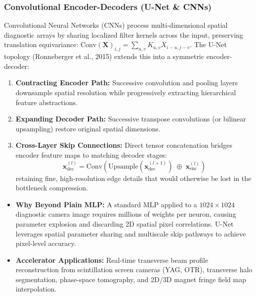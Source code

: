 \documentclass[11pt,a4paper]{article}
\begin{document}
\subsubsection{Convolutional Encoder-Decoders (U-Net \& CNNs)}
Convolutional Neural Networks (CNNs) process multi-dimensional spatial diagnostic arrays by sharing localized filter kernels across the input, preserving translation equivariance: $\text{Conv}(\mathbf{X})_{i,j} = \sum_{u,v} K_{u,v} X_{i-u, j-v}$. The U-Net topology (Ronneberger et al., 2015) extends this into a symmetric encoder-decoder:
\begin{enumerate}
    \item \textbf{Contracting Encoder Path:} Successive convolution and pooling layers downsample spatial resolution while progressively extracting hierarchical feature abstractions.
    \item \textbf{Expanding Decoder Path:} Successive transpose convolutions (or bilinear upsampling) restore original spatial dimensions.
    \item \textbf{Cross-Layer Skip Connections:} Direct tensor concatenation bridges encoder feature maps to matching decoder stages:
    \begin{equation}
        \mathbf{x}_{\text{dec}}^{(l)} = \text{Conv}\left( \text{Upsample}\left(\mathbf{x}_{\text{dec}}^{(l+1)}\right) \;\oplus\; \mathbf{x}_{\text{enc}}^{(l)} \right)
    \end{equation}
    retaining fine, high-resolution edge details that would otherwise be lost in the bottleneck compression.
\end{enumerate}
\begin{itemize}
    \item \textbf{Why Beyond Plain MLP:} A standard MLP applied to a $1024 \times 1024$ diagnostic camera image requires millions of weights per neuron, causing parameter explosion and discarding 2D spatial pixel correlations. U-Net leverages spatial parameter sharing and multiscale skip pathways to achieve pixel-level accuracy.
    \item \textbf{Accelerator Applications:} Real-time transverse beam profile reconstruction from scintillation screen cameras (YAG, OTR), transverse halo segmentation, phase-space tomography, and 2D/3D magnet fringe field map interpolation.
\end{itemize}
\end{document}
